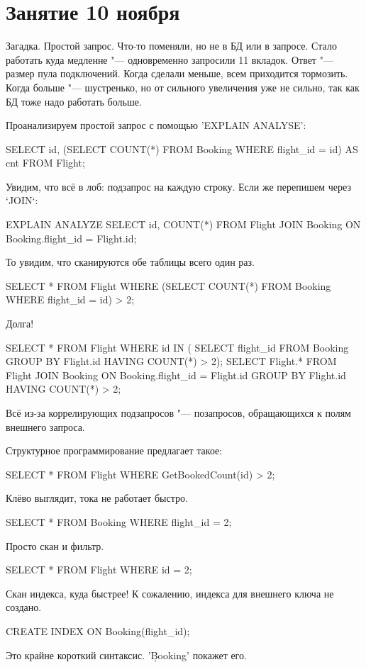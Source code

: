 \chapter{Занятие 10 ноября}

Загадка. Простой запрос. Что-то поменяли, но не в БД или в запросе. Стало работать куда медленне "--- одновременно запросили 11 вкладок.
Ответ "--- размер пула подключений.
Когда сделали меньше, всем приходится тормозить. Когда больше "--- шустренько, но от сильного увеличения уже не сильно, так как БД тоже надо работать больше.

Проанализируем простой запрос с помощью \sql'EXPLAIN ANALYSE':
\begin{sqlcode}
SELECT
	id, (SELECT COUNT(*) FROM Booking WHERE flight_id = id) AS cnt
	FROM Flight;
\end{sqlcode}
Увидим, что всё в лоб: подзапрос на каждую строку.
Если же перепишем через `JOIN`:
\begin{sqlcode}
EXPLAIN ANALYZE SELECT
	id, COUNT(*)
	FROM Flight
	JOIN Booking ON Booking.flight_id = Flight.id;
\end{sqlcode}
То увидим, что сканируются обе таблицы всего один раз.

\begin{sqlcode}
SELECT *
	FROM Flight
	WHERE (SELECT COUNT(*) FROM Booking WHERE flight_id = id) > 2;
\end{sqlcode}
Долга!
\begin{sqlcode}
SELECT *
	FROM Flight
	WHERE id IN (
		SELECT flight_id
		FROM Booking
		GROUP BY Flight.id
		HAVING COUNT(*) > 2);
SELECT Flight.*
	FROM Flight
	JOIN Booking ON Booking.flight_id = Flight.id
	GROUP BY Flight.id
	HAVING COUNT(*) > 2;
\end{sqlcode}
Всё из-за коррелирующих подзапросов "--- позапросов, обращающихся к полям внешнего запроса.

Структурное программирование предлагает такое:
\begin{sqlcode}
SELECT *
	FROM Flight
	WHERE GetBookedCount(id) > 2;
\end{sqlcode}
Клёво выглядит, тока не работает быстро.

\begin{sqlcode}
SELECT *
	FROM Booking
	WHERE flight_id = 2;
\end{sqlcode}
Просто скан и фильтр.
\begin{sqlcode}
SELECT *
	FROM Flight 
	WHERE id = 2;
\end{sqlcode}
Скан индекса, куда быстрее!
К сожалению, индекса для внешнего ключа не создано.
\begin{sqlcode}
CREATE INDEX ON Booking(flight_id);
\end{sqlcode}
Это крайне короткий синтаксис. \sql'\d Booking' покажет его.

